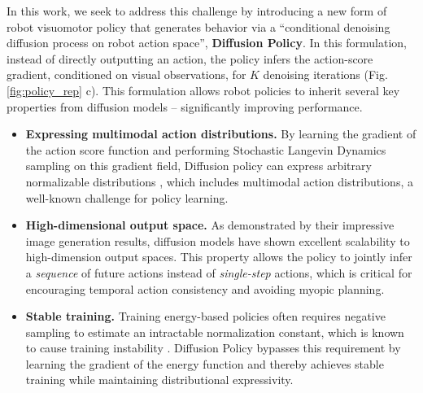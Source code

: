 \documentclass[Afour,sageh,times]{sagej}
\begin{document}
In this work, we seek to address this challenge by introducing a new form of robot visuomotor policy that generates behavior via a ``conditional denoising diffusion process \cite{ho2020denoising} on robot action space'', \textbf{Diffusion Policy}. In this formulation, instead of directly outputting an action, the policy infers the action-score gradient, conditioned on visual observations, for $K$ denoising iterations (Fig. \ref{fig:policy_rep} c).
This formulation allows robot policies to inherit several key properties from diffusion models -- significantly improving performance.
\begin{itemize} %

    \item \textbf{Expressing multimodal action distributions.}
     By learning the gradient of the action score function \cite{song2019score} and performing Stochastic Langevin Dynamics sampling on this gradient field, Diffusion policy can express arbitrary normalizable distributions \cite{neal2011mcmc}, which includes multimodal action distributions, a well-known challenge for policy learning.

    \item \textbf{High-dimensional output space.} As demonstrated by their impressive image generation results, diffusion models have shown excellent scalability to high-dimension output spaces. This property allows the policy to jointly infer a \textit{sequence} of future actions instead of \textit{single-step} actions, which is critical for encouraging temporal action consistency and avoiding myopic planning.

    \item \textbf{Stable training.}
    Training energy-based policies often requires negative sampling to estimate an intractable normalization constant, which is known to cause training instability \cite{du2020improved,ibc}. Diffusion Policy bypasses this requirement by learning the gradient of the energy function and thereby achieves stable training while maintaining distributional expressivity. %

\end{itemize}
\end{document}

